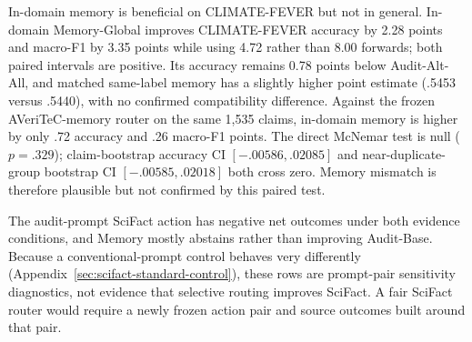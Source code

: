 \documentclass[runningheads]{llncs}
\begin{document}
\begin{table}[t]
\caption{In-domain outcome-memory test. $\Delta$Accuracy is natural
Memory-Global minus Audit-Base with a paired 95\% bootstrap interval. SciFact
train$\rightarrow$dev routing uses train outcomes only; dev labels are read
after routes are fixed.}
\label{tab:in-domain-memory}
\centering\small
{}
\end{table}

In-domain memory is beneficial on CLIMATE-FEVER but not in general.
In-domain Memory-Global improves CLIMATE-FEVER accuracy by 2.28 points and
macro-F1 by 3.35 points while using 4.72 rather than 8.00 forwards; both
paired intervals are positive. Its accuracy remains 0.78 points below
Audit-Alt-All, and matched same-label memory has a slightly higher point estimate
(.5453 versus .5440), with no confirmed compatibility difference. Against
the frozen AVeriTeC-memory router on the same 1,535 claims, in-domain memory
is higher by only .72 accuracy and .26 macro-F1 points. The direct McNemar
test is null ($p=.329$); claim-bootstrap accuracy CI
$[-.00586,.02085]$ and near-duplicate-group bootstrap CI
$[-.00585,.02018]$ both cross zero. Memory mismatch is therefore plausible
but not confirmed by this paired test.

The audit-prompt SciFact action has negative net outcomes under both evidence
conditions, and Memory mostly abstains rather than improving Audit-Base. Because a
conventional-prompt control behaves very differently
(Appendix~\ref{sec:scifact-standard-control}), these rows are prompt-pair
sensitivity diagnostics, not evidence that selective routing improves
SciFact. A fair SciFact router would require a newly frozen action pair and
source outcomes built around that pair.
\end{document}
